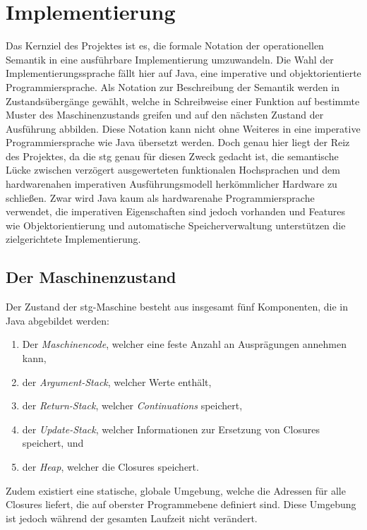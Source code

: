 
\newcommand{\concat}{\mathbin{+\mkern-10mu+}}

\chapter{Implementierung}\label{chap:implementierung}

Das Kernziel des Projektes ist es, die formale Notation der operationellen Semantik in eine ausführbare Implementierung umzuwandeln.
Die Wahl der Implementierungssprache fällt hier auf Java, eine imperative und objektorientierte Programmiersprache.
Als Notation zur Beschreibung der Semantik werden in  Zustandsübergänge gewählt, welche in Schreibweise einer Funktion auf bestimmte Muster des Maschinenzustands greifen und auf den nächsten Zustand der Ausführung abbilden.
Diese Notation kann nicht ohne Weiteres in eine imperative Programmiersprache wie Java übersetzt werden.
Doch genau hier liegt der Reiz des Projektes, da die \gls{stg} genau für diesen Zweck gedacht ist, die semantische Lücke zwischen verzögert ausgewerteten funktionalen Hochsprachen und dem hardwarenahen imperativen Ausführungsmodell herkömmlicher Hardware zu schließen.
Zwar wird Java kaum als hardwarenahe Programmiersprache verwendet, die imperativen Eigenschaften sind jedoch vorhanden und Features wie Objektorientierung und automatische Speicherverwaltung unterstützen die zielgerichtete Implementierung.

\section{Der Maschinenzustand}

Der Zustand der \gls{stg}-Maschine besteht aus insgesamt fünf Komponenten, die in Java abgebildet werden:

\begin{enumerate}
\item Der \textit{Maschinencode}, welcher eine feste Anzahl an Ausprägungen annehmen kann,
\item der \textit{Argument-Stack}, welcher Werte enthält,
\item der \textit{Return-Stack}, welcher \textit{Continuations} speichert,
\item der \textit{Update-Stack}, welcher Informationen zur Ersetzung von Closures speichert, und
\item der \textit{Heap}, welcher die Closures speichert.
\end{enumerate}

Zudem existiert eine statische, globale Umgebung, welche die Adressen für alle Closures liefert, die auf oberster Programmebene definiert sind.
Diese Umgebung ist jedoch während der gesamten Laufzeit nicht verändert.

